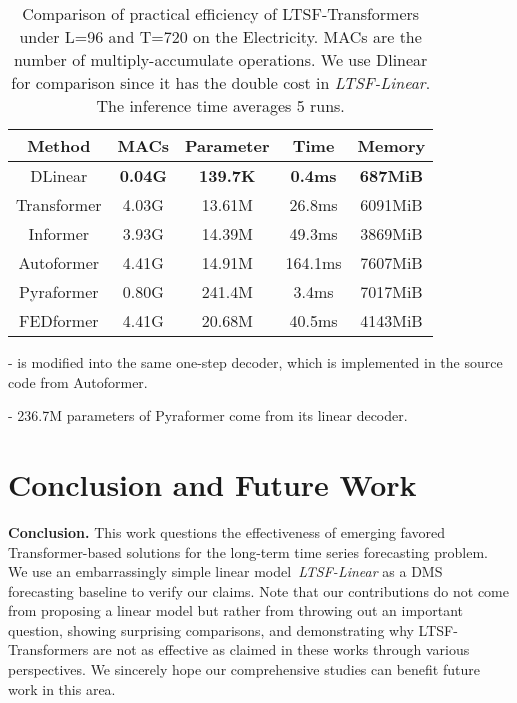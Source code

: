 \documentclass[10pt,twocolumn,letterpaper]{article}
\newcommand{\modelname}{\emph{LTSF-Linear}\xspace}
\begin{document}
\begin{table}[h]
\vspace{-0.1cm}
        \centering
        \scalebox{0.9}
{
        	{\begin{tabular}{c|cccc} \hline
                Method      & MACs & Parameter & Time & Memory\\\hline
                DLinear  & \textbf{0.04G}   & \textbf{139.7K}    & \textbf{0.4ms}     &\textbf{687MiB}        \\\hline
                Transformer & 4.03G   & 13.61M     & 26.8ms     &6091MiB \\
                Informer    & 3.93G   & 14.39M     & 49.3ms     &3869MiB        \\
                Autoformer  & 4.41G   & 14.91M     & 164.1ms     &7607MiB        \\
                Pyraformer & 0.80G    &  241.4M   & 3.4ms     &7017MiB          \\
                FEDformer   & 4.41G   & 20.68M     & 40.5ms     &4143MiB \\\hline       
\end{tabular}}
            }
            \begin{tablenotes}
            \tiny
            {
            \item -  is modified into the same one-step decoder, which is implemented in the source code from Autoformer.
            \item -  236.7M parameters of Pyraformer come from its linear decoder. 
            }
            \end{tablenotes} \vspace{-0.2cm}
        \caption{Comparison of practical efficiency of LTSF-Transformers under L=96 and T=720 on the Electricity. MACs are the number of multiply-accumulate operations. We use Dlinear for comparison since it has the double cost in \modelname. The inference time averages 5 runs.}
\label{tab:efficiency}
\vspace{-0.3cm}
\end{table}




 \vspace{-0.4cm}
\section{Conclusion and Future Work}
\label{sec:conclusion}
\textbf{Conclusion.}
This work questions the effectiveness of emerging favored Transformer-based solutions for the long-term time series forecasting problem. We use an embarrassingly simple linear model~\modelname as a DMS forecasting baseline to verify our claims. Note that our contributions do not come from proposing a linear model but rather from throwing out an important question, showing surprising comparisons, and demonstrating why LTSF-Transformers are not as effective as claimed in these works through various perspectives.
We sincerely hope our comprehensive studies can benefit future work in this area.
\end{document}

